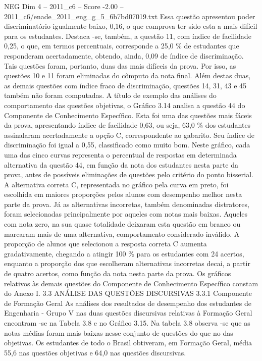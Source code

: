 \begin{textsample}{NEG Dim 4 – 2011\_c6 – Score -2.00 – 2011\_c6/enade\_2011\_eng\_g\_5\_6b7bd07019.txt}
Essa questão apresentou poder discriminatório igualmente baixo, 0,16, o que comprova ter sido esta a mais difícil para os estudantes.
Destaca -se, também, a questão 11, com índice de facilidade 0,25, o que, em termos percentuais, corresponde a 25,0 \% de estudantes que responderam acertadamente, obtendo, ainda, 0,09 de índice de discriminação.
Tais questões foram, portanto, duas das mais difíceis da prova.
Por isso, as questões 10 e 11 foram eliminadas do cômputo da nota final.
Além destas duas, as demais questões com índice fraco de discriminação, questões 14, 31, 43 e 45 também não foram computadas.
A título de exemplo das análises do comportamento das questões objetivas, o Gráfico 3.14 analisa a questão 44 do Componente de Conhecimento Específico.
Esta foi uma das questões mais fáceis da prova, apresentando índice de facilidade 0,63, ou seja, 63,0 \% dos estudantes assinalaram acertadamente a opção C, correspondente ao gabarito.
Seu índice de discriminação foi igual a 0,55, classificado como muito bom.
Neste gráfico, cada uma das cinco curvas representa o percentual de respostas em determinada alternativa da questão 44, em função da nota dos estudantes nesta parte da prova, antes de possíveis eliminações de questões pelo critério do ponto bisserial.
A alternativa correta C, representada no gráfico pela curva em preto, foi escolhida em maiores proporções pelos alunos com desempenho melhor nesta parte da prova.
Já as alternativas incorretas, também denominadas distratores, foram selecionadas principalmente por aqueles com notas mais baixas.
Aqueles com nota zero, na sua quase totalidade deixaram esta questão em branco ou marcaram mais de uma alternativa, comportamento considerado inválido.
A proporção de alunos que selecionou a resposta correta C aumenta gradativamente, chegando a atingir 100 \% para os estudantes com 24 acertos, enquanto a proporção dos que escolheram alternativas incorretas decai, a partir de quatro acertos, como função da nota nesta parte da prova.
Os gráficos relativos às demais questões do Componente de Conhecimento Específico constam do Anexo I. 3.3 ANÁLISE DAS QUESTÕES DISCURSIVAS 3.3.1 Componente de Formação Geral As análises dos resultados de desempenho dos estudantes de Engenharia - Grupo V nas duas questões discursivas relativas à Formação Geral encontram -se na Tabela 3.8 e no Gráfico 3.15.
Na tabela 3.8 observa -se que as notas médias foram mais baixas nesse conjunto de questões do que no das objetivas.
Os estudantes de todo o Brasil obtiveram, em Formação Geral, média 55,6 nas questões objetivas e 64,0 nas questões discursivas.

\end{textsample}
